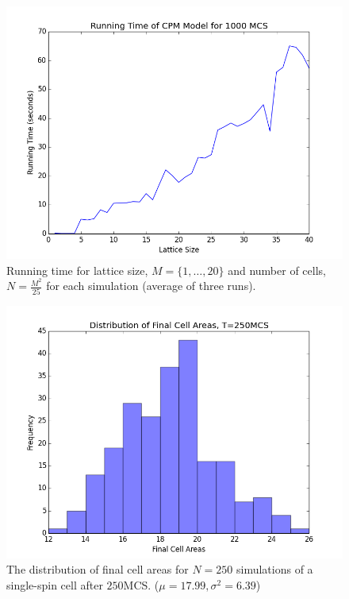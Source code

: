 \documentclass[12pt]{article}
\begin{document}
\begin{figure}[H]
	\centering
	\includegraphics[scale=0.5]{img/runningtime}
	\caption{Running time for lattice size, $M =\{1,\ldots, 20\}$ and number of cells, $N=\frac{M^2}{25}$ for each simulation (average of three runs).}
	\label{runningtime}
\end{figure}

\pagebreak

\begin{figure}[H]
	\centering
	\includegraphics[scale=0.5]{img/cellareas}
	\caption{The distribution of final cell areas for $N=250$ simulations of a single-spin cell after $250$MCS. ($\mu = 17.99, \sigma^2=6.39$) }
	\label{cellareas}
\end{figure}
\end{document}
